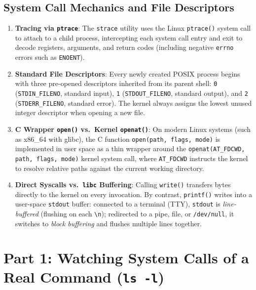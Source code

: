 \documentclass[12pt,a4paper]{article}
\begin{document}
\subsection{System Call Mechanics and File Descriptors}
\begin{enumerate}
    \item \textbf{Tracing via \texttt{ptrace}}: The \texttt{strace} utility uses the Linux \texttt{ptrace()} system call to attach to a child process, intercepting each system call entry and exit to decode registers, arguments, and return codes (including negative \texttt{errno} errors such as \texttt{ENOENT}).
    \item \textbf{Standard File Descriptors}: Every newly created POSIX process begins with three pre-opened descriptors inherited from its parent shell: \texttt{0} (\texttt{STDIN\_FILENO}, standard input), \texttt{1} (\texttt{STDOUT\_FILENO}, standard output), and \texttt{2} (\texttt{STDERR\_FILENO}, standard error). The kernel always assigns the lowest unused integer descriptor when opening a new file.
    \item \textbf{C Wrapper \texttt{open()} vs.\ Kernel \texttt{openat()}}: On modern Linux systems (such as x86\_64 with glibc), the C function \texttt{open(path, flags, mode)} is implemented in user space as a thin wrapper around the \texttt{openat(AT\_FDCWD, path, flags, mode)} kernel system call, where \texttt{AT\_FDCWD} instructs the kernel to resolve relative paths against the current working directory.
    \item \textbf{Direct Syscalls vs.\ \texttt{libc} Buffering}: Calling \texttt{write()} transfers bytes directly to the kernel on every invocation. By contrast, \texttt{printf()} writes into a user-space \texttt{stdout} buffer: connected to a terminal (TTY), \texttt{stdout} is \emph{line-buffered} (flushing on each \texttt{\textbackslash n}); redirected to a pipe, file, or \texttt{/dev/null}, it switches to \emph{block buffering} and flushes multiple lines together.
\end{enumerate}

\newpage

\section{Part 1: Watching System Calls of a Real Command (\texttt{ls -l})}
\end{document}
